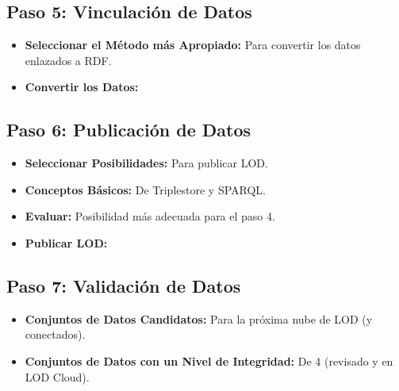 \documentclass[11pt]{report}
\begin{document}
		\subsection*{Paso 5: Vinculación de Datos}
		\begin{itemize}
			\item \textbf{Seleccionar el Método más Apropiado:} Para convertir los datos enlazados a RDF.
			
			\item \textbf{Convertir los Datos:}
		\end{itemize}
		\subsection*{Paso 6: Publicación de Datos}
		\begin{itemize}
			\item \textbf{Seleccionar Posibilidades:} Para publicar LOD.
			
			\item \textbf{Conceptos Básicos:} De Triplestore y SPARQL.
			
			\item \textbf{Evaluar:} Posibilidad más adecuada para el paso 4.
			
			\item \textbf{Publicar LOD:}
		\end{itemize}
		\subsection*{Paso 7: Validación de Datos}
		\begin{itemize}
			\item \textbf{Conjuntos de Datos Candidatos:} Para la próxima nube de LOD (y conectados).
			
			\item \textbf{Conjuntos de Datos con un Nivel de Integridad:} De 4 (revisado y en LOD Cloud).
		\end{itemize}
\end{document}
